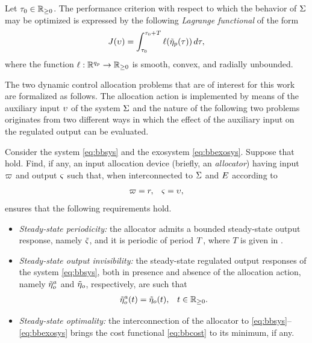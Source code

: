 Let $\tau_0\in\mathbb{R}_{\geq 0}$. The performance criterion with respect to which the behavior of $\Sigma$ may be optimized is expressed by the following \emph{Lagrange functional} of the form
\begin{equation}
  \label{eq:bbcost}
  J(\upsilon) = \int_{\tau_0}^{\tau_0 + T} \ell(\tilde{\eta}_p(\tau))\,d\tau,
\end{equation}
where the function $\ell : \mathbb{R}^{{q_p}} \rightarrow \mathbb{R}_{\geq 0}$ is smooth, convex, and radially unbounded.

The two dynamic control allocation problems that are of interest for this work are formalized as follows. The allocation action is implemented by means of the auxiliary input $\upsilon$ of the system $\Sigma$ and the nature of the following two problems originates from two different ways in which the effect of the auxiliary input on the regulated output can be evaluated.

\begin{problem}
  \label{prb:ssinv}
  Consider the system \eqref{eq:bbsys} and the exosystem \eqref{eq:bbexosys}. Suppose that  hold.
  Find, if any, an input allocation device (briefly, an \emph{allocator}) having input $\varpi$ and output $\varsigma$ such that, when interconnected to $\Sigma$ and $E$ according to
	\begin{subequations}
	  \begin{align}
	  	\varpi = r, & & \varsigma = \upsilon,
	  \end{align}
  \end{subequations}
  ensures that the following requirements hold.
  \begin{itemize}
		\item[\emph{(P)}] \emph{Steady-state periodicity:} the allocator admits a bounded steady-state output response, namely $\tilde{\varsigma}$, and it is periodic of period $T$, where $T$ is given in .
		\item[\emph{(I)}] \emph{Steady-state output invisibility:} the steady-state regulated output responses of the system \eqref{eq:bbsys}, both in presence and absence of the allocation action, namely $\tilde{\eta}_o^a$ and $\tilde{\eta}_o$, respectively, are such that
		  \begin{align}
		    \label{eq:ssinv}
		    \tilde{\eta}_o^a(t) &= \tilde{\eta}_o(t), & t\in\mathbb{R}_{\geq 0}.
		  \end{align}
		\item[\emph{(O)}] \emph{Steady-state optimality:} the interconnection of the allocator to \eqref{eq:bbsys}--\eqref{eq:bbexosys} brings the cost functional \eqref{eq:bbcost} to its minimum, if any.
    \end{itemize}
    \closestatement
\end{problem}

